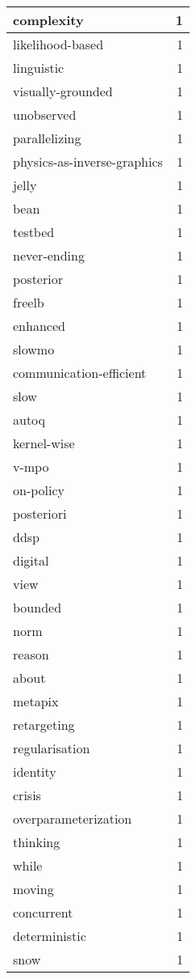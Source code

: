 \begin{table}[h]
\begin{tabular}{|l|r|}
\hline
complexity & 1 \\
\hline
likelihood-based & 1 \\
\hline
linguistic & 1 \\
\hline
visually-grounded & 1 \\
\hline
unobserved & 1 \\
\hline
parallelizing & 1 \\
\hline
physics-as-inverse-graphics & 1 \\
\hline
jelly & 1 \\
\hline
bean & 1 \\
\hline
testbed & 1 \\
\hline
never-ending & 1 \\
\hline
posterior & 1 \\
\hline
freelb & 1 \\
\hline
enhanced & 1 \\
\hline
slowmo & 1 \\
\hline
communication-efficient & 1 \\
\hline
slow & 1 \\
\hline
autoq & 1 \\
\hline
kernel-wise & 1 \\
\hline
v-mpo & 1 \\
\hline
on-policy & 1 \\
\hline
posteriori & 1 \\
\hline
ddsp & 1 \\
\hline
digital & 1 \\
\hline
view & 1 \\
\hline
bounded & 1 \\
\hline
norm & 1 \\
\hline
reason & 1 \\
\hline
about & 1 \\
\hline
metapix & 1 \\
\hline
retargeting & 1 \\
\hline
regularisation & 1 \\
\hline
identity & 1 \\
\hline
crisis & 1 \\
\hline
overparameterization & 1 \\
\hline
thinking & 1 \\
\hline
while & 1 \\
\hline
moving & 1 \\
\hline
concurrent & 1 \\
\hline
deterministic & 1 \\
\hline
snow & 1 \\

\end{tabular}
\end{table}
